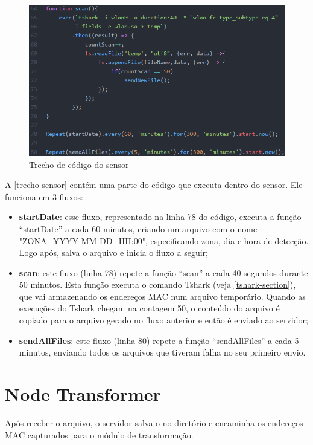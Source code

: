 \begin{figure}[!h]
  \caption{\label{trecho-sensor}Trecho de código do sensor}
  \begin{center}
    \includegraphics[width=1.0\textwidth]{img/sensor.png}
  \end{center}
\end{figure}

A \autoref{trecho-sensor} contém uma parte do código que executa dentro do
sensor. Ele funciona em 3 fluxos:

\begin{itemize}
    \item \textbf{startDate}: esse fluxo, representado na linha 78
    do código, executa a função ``startDate'' a cada 60 minutos, criando um arquivo com
    o nome "ZONA\_YYYY-MM-DD\_HH:00", especificando zona, dia e hora de detecção. Logo
    após, salva o arquivo e inicia o fluxo a seguir;
    \item \textbf{scan}: este fluxo (linha 78) repete a função ``scan'' a cada 40 segundos durante 50 minutos. Esta função executa o
    comando Tshark (veja \autoref{tshark-section}), que vai armazenando os endereços
    MAC num arquivo temporário. Quando as execuções do Tshark chegam na contagem 50,
    o conteúdo do arquivo é copiado para o arquivo gerado no fluxo anterior e então é enviado ao servidor;
    \item \textbf{sendAllFiles}: este fluxo (linha 80) repete a função ``sendAllFiles'' a cada 5 minutos, enviando todos os arquivos que tiveram falha no seu primeiro envio.
\end{itemize}

\section{Node Transformer}
\label{node-transformer}
Após receber o arquivo, o servidor salva-o no diretório e encaminha os endereços MAC capturados para o
módulo de transformação.


